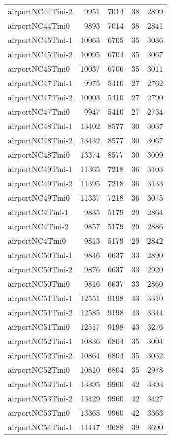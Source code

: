 \begin{longtable}{lrrrr}
airportNC44Tini-2 & 9951 & 7014 & 38 & 2899 \\
airportNC44Tini0 & 9893 & 7014 & 38 & 2841 \\
airportNC45Tini-1 & 10063 & 6705 & 35 & 3036 \\
airportNC45Tini-2 & 10095 & 6704 & 35 & 3067 \\
airportNC45Tini0 & 10037 & 6706 & 35 & 3011 \\
airportNC47Tini-1 & 9975 & 5410 & 27 & 2762 \\
airportNC47Tini-2 & 10003 & 5410 & 27 & 2790 \\
airportNC47Tini0 & 9947 & 5410 & 27 & 2734 \\
airportNC48Tini-1 & 13402 & 8577 & 30 & 3037 \\
airportNC48Tini-2 & 13432 & 8577 & 30 & 3067 \\
airportNC48Tini0 & 13374 & 8577 & 30 & 3009 \\
airportNC49Tini-1 & 11365 & 7218 & 36 & 3103 \\
airportNC49Tini-2 & 11395 & 7218 & 36 & 3133 \\
airportNC49Tini0 & 11337 & 7218 & 36 & 3075 \\
airportNC4Tini-1 & 9835 & 5179 & 29 & 2864 \\
airportNC4Tini-2 & 9857 & 5179 & 29 & 2886 \\
airportNC4Tini0 & 9813 & 5179 & 29 & 2842 \\
airportNC50Tini-1 & 9846 & 6637 & 33 & 2890 \\
airportNC50Tini-2 & 9876 & 6637 & 33 & 2920 \\
airportNC50Tini0 & 9816 & 6637 & 33 & 2860 \\
airportNC51Tini-1 & 12551 & 9198 & 43 & 3310 \\
airportNC51Tini-2 & 12585 & 9198 & 43 & 3344 \\
airportNC51Tini0 & 12517 & 9198 & 43 & 3276 \\
airportNC52Tini-1 & 10836 & 6804 & 35 & 3004 \\
airportNC52Tini-2 & 10864 & 6804 & 35 & 3032 \\
airportNC52Tini0 & 10810 & 6804 & 35 & 2978 \\
airportNC53Tini-1 & 13395 & 9960 & 42 & 3393 \\
airportNC53Tini-2 & 13429 & 9960 & 42 & 3427 \\
airportNC53Tini0 & 13365 & 9960 & 42 & 3363 \\
airportNC54Tini-1 & 14447 & 9688 & 39 & 3690 \\

\end{longtable}
